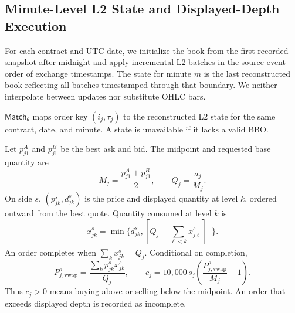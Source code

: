 \documentclass[sigconf]{acmart}
\begin{document}
\subsection{Minute-Level L2 State and Displayed-Depth Execution}
For each contract and UTC date, we initialize the book from the first recorded snapshot after midnight and apply incremental L2 batches in the source-event order of exchange timestamps. The state for minute $m$ is the last reconstructed book reflecting all batches timestamped through that boundary. We neither interpolate between updates nor substitute OHLC bars.

$\mathsf{Match}_{\theta}$ maps order key $(i_j,\tau_j)$ to the reconstructed L2 state for the same contract, date, and minute. A state is unavailable if it lacks a valid BBO.

Let $p^A_{j1}$ and $p^B_{j1}$ be the best ask and bid. The midpoint and requested base quantity are
\begin{equation}
M_j=\frac{p^A_{j1}+p^B_{j1}}{2},
\qquad Q_j=\frac{a_j}{M_j}.
\end{equation}
On side $s$, $(p^s_{jk},d^s_{jk})$ is the price and displayed quantity at level $k$, ordered outward from the best quote. Quantity consumed at level $k$ is
\begin{equation}
x^s_{jk}=\min\!\{d^s_{jk},
[Q_j-\sum_{\ell<k}x^s_{j\ell}]_+\}.
\end{equation}
An order completes when $\sum_k x^s_{jk}=Q_j$. Conditional on completion,
\begin{equation}
P^{s}_{j,\mathrm{vwap}}=\frac{\sum_k p^s_{jk}x^s_{jk}}{Q_j},
\qquad
c_j=10{,}000\,s_j\!\left(\frac{P^{s}_{j,\mathrm{vwap}}}{M_j}-1\right).
\end{equation}
Thus $c_j>0$ means buying above or selling below the midpoint. An order that exceeds displayed depth is recorded as incomplete.
\end{document}
